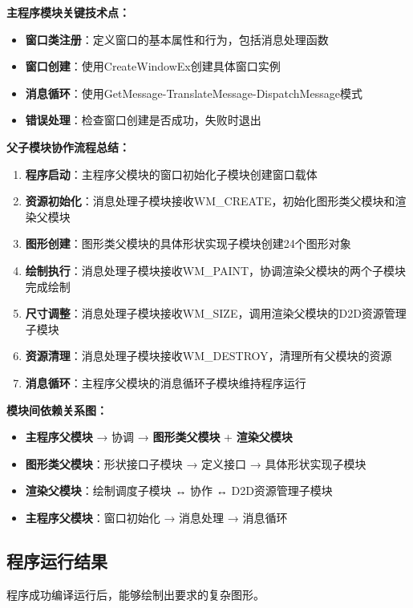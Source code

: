 \documentclass[12pt,a4paper]{article}
\begin{document}
\textbf{主程序模块关键技术点：}
\begin{itemize}
    \item \textbf{窗口类注册}：定义窗口的基本属性和行为，包括消息处理函数
    \item \textbf{窗口创建}：使用CreateWindowEx创建具体窗口实例
    \item \textbf{消息循环}：使用GetMessage-TranslateMessage-DispatchMessage模式
    \item \textbf{错误处理}：检查窗口创建是否成功，失败时退出
\end{itemize}

\textbf{父子模块协作流程总结：}
\begin{enumerate}
    \item \textbf{程序启动}：主程序父模块的窗口初始化子模块创建窗口载体
    \item \textbf{资源初始化}：消息处理子模块接收WM\_CREATE，初始化图形类父模块和渲染父模块
    \item \textbf{图形创建}：图形类父模块的具体形状实现子模块创建24个图形对象
    \item \textbf{绘制执行}：消息处理子模块接收WM\_PAINT，协调渲染父模块的两个子模块完成绘制
    \item \textbf{尺寸调整}：消息处理子模块接收WM\_SIZE，调用渲染父模块的D2D资源管理子模块
    \item \textbf{资源清理}：消息处理子模块接收WM\_DESTROY，清理所有父模块的资源
    \item \textbf{消息循环}：主程序父模块的消息循环子模块维持程序运行
\end{enumerate}

\textbf{模块间依赖关系图：}
\begin{itemize}
    \item \textbf{主程序父模块} → 协调 → \textbf{图形类父模块} + \textbf{渲染父模块}
    \item \textbf{图形类父模块}：形状接口子模块 → 定义接口 → 具体形状实现子模块
    \item \textbf{渲染父模块}：绘制调度子模块 ↔ 协作 ↔ D2D资源管理子模块
    \item \textbf{主程序父模块}：窗口初始化 → 消息处理 → 消息循环
\end{itemize}

\subsection{程序运行结果}

程序成功编译运行后，能够绘制出要求的复杂图形。
\end{document}

